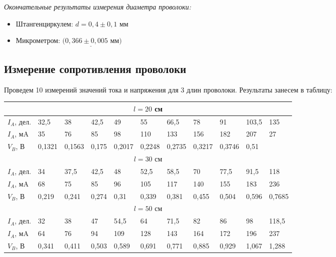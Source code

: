 \documentclass[a4paper,12pt]{article} %
\begin{document}
\textit{Окончательные результаты измерения диаметра проволоки:}

\begin{itemize}
	\item Штангенциркулем: $ d = 0,4 \pm 0,1 \text{ мм}  $
	\item Микрометром:  $ \underline{(0,366 \pm 0,005 \text{ мм}})  $
\end{itemize}
\newpage
\subsection{Измерение сопротивления проволоки}
Проведем 10 измерений значений тока и напряжения для 3 длин проволоки. Результаты занесем в таблицу:



\begin{table}[h]
\noindent\begin{tabular}{|p{}|p{1cm}|p{1cm}|p{1cm}|p{1cm}|p{1cm}|p{1cm}|p{1cm}|p{1cm}|p{1cm}|p{1cm}|}
		\hline
		\multicolumn{11}{|c|}{$ l = 20 $ см}                                                                    \\ \hline
		$ I_A $, дел. 
		&32,5&38& 42,5& 49& 55& 66,5& 78& 91& 103,5& 135\\ \hline
		$ I_A$, мA &
		35&
		76& 85& 98& 110& 133& 156& 182 & 207 & 27
\\ \hline
		$ V_B $, В      & 0,1321 & 0,1563 & 0,175 & 0,2017 & 0,2248 & 0,2735 & 0,3217 & 0,3746 & 0,51  \\ \hline


		\multicolumn{11}{|c|}{$ l = 30 $ см}                                                                    \\ \hline
		$ I_A $, дел. & 34    & 37,5  & 42,5  & 48   & 52,5  & 58,5  & 70    & 77,5  & 91,5  & 118    \\
 \hline
		$ I_A$, мA    &  68    & 75    & 85    & 96   & 105   & 117   & 140   & 155   & 183   & 236    \\
 \hline
		$  V_B $, В  & 0,219 & 0,241 & 0,274 & 0,31 & 0,339 & 0,381 & 0,455 & 0,504 & 0,596 & 0,7685 \\
 \hline


		\multicolumn{11}{|c|}{$ l = 50 $ см}                                                                    \\ \hline
		$ I_A $, дел. & 32&	38&	47&	54,5&	64	&71,5	&82&	86&	98&	118,5    \\ \hline
		$ I_A$, мA      & 64&	76&	94&	109&	128&	143&	164&	172&	196&	237    \\ \hline
		$  V_B $, В     & 0,341&	0,411&	0,503&	0,589&	0,691&	0,771&	0,885&	0,929&	1,067&	1,288 \\ \hline
	\end{tabular}
\end{table}
\end{document}
